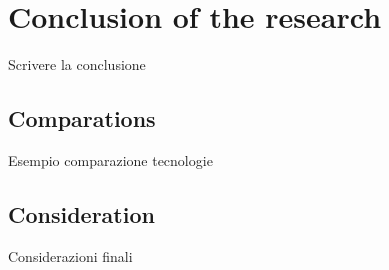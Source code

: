 

\section{Conclusion of the research}
Scrivere la conclusione

\subsection{Comparations}
Esempio comparazione tecnologie

\subsection{Consideration}
Considerazioni finali

